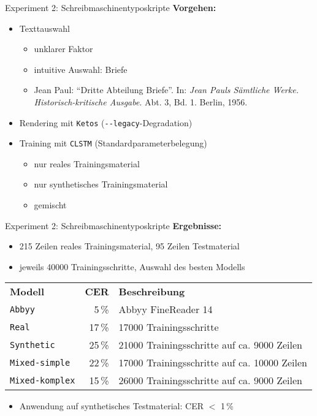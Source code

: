 \documentclass{bbawslides}
\begin{document}
\begin{bbawslide}{Experiment 2: Schreibmaschinentyposkripte}
  \vspace*{7mm}%
  \centerslidestrue%
  \textbf{Vorgehen:}
  \begin{itemize}
    \item Texttauswahl
    \begin{itemize}\small
      \item unklarer Faktor
      \item intuitive Auswahl: Briefe
      \item Jean Paul: \enquote{Dritte Abteilung Briefe}. In: \emph{Jean Pauls Sämtliche Werke. Historisch-kritische Ausgabe}. Abt. 3, Bd. 1. Berlin, 1956.
    \end{itemize}
    \item Rendering mit \texttt{Ketos} (\verb_--_\texttt{legacy}-Degradation)
    \item Training mit \texttt{CLSTM} (Standardparameterbelegung)
    \begin{itemize}\small
      \item nur reales Trainingsmaterial
      \item nur synthetisches Trainingsmaterial
      \item gemischt
    \end{itemize}
  \end{itemize}
\end{bbawslide}

\begin{bbawslide}{Experiment 2: Schreibmaschinentyposkripte}
  \vspace*{7mm}%
  \centerslidestrue%
  \textbf{Ergebnisse:}
  \begin{itemize}
    \item 215 Zeilen reales Trainingsmaterial, 95 Zeilen Testmaterial
    \item jeweils 40000 Trainingsschritte, Auswahl des besten Modells
  \end{itemize}
  \begin{tabular}{lrp{}}
    \textbf{Modell} & \textbf{CER} & \textbf{Beschreibung}\\
    \texttt{Abbyy} & 5\,\% & Abbyy FineReader 14\\
    \texttt{Real} & 17\,\% & 17000 Trainingsschritte \\
    \texttt{Synthetic} & 25\,\% & 21000 Trainingsschritte auf ca. 9000 Zeilen\\
    \texttt{Mixed-simple} & 22\,\% & 17000 Trainingsschritte auf ca. 10000 Zeilen \\
    \texttt{Mixed-komplex} & 15\,\% & 26000 Trainingsschritte auf ca. 9000 Zeilen \\
  \end{tabular}
  \begin{itemize}
    \item Anwendung auf synthetisches Testmaterial: CER $<$ 1\,\%
  \end{itemize}
\end{bbawslide}
\end{document}
